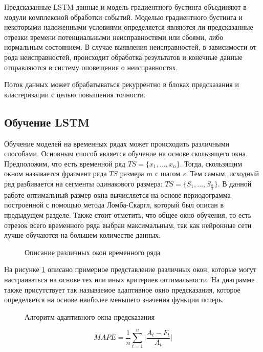 Предсказанные LSTM данные и модель градиентного бустинга
объединяют в модули комплексной обработки событий.
Моделью градиентного бустинга и некоторыми
наложенными условиями определяется
являются ли предсказанные отрезки времени
потенциальными неисправностями или сбоями,
либо нормальным состоянием.
В случае выявления неисправностей,
в зависимости от рода неисправностей,
происходит обработка результатов и
конечные данные отправляются в систему оповещения о неисправностях.

Поток данных может обрабатываться рекуррентно в блоках
предсказания и кластеризации с целью повышения точности.

\subsection{Обучение LSTM}

Обучение моделей на временных рядах может происходить различными способами.
Основным способ является обучение на основе скользящего окна.
Предположим, что есть временной ряд $TS = \{x_1, ..., x_n\}$.
Тогда, скользящим окном называется фрагмент ряда $TS$ размера $m$ с шагом $s$.
Тем самым, исходный ряд разбивается на сегменты одинакового размера: $TS = \{S_1, ..., S_{\frac{n}{s}}\}$.
В данной работе оптимальный размер окна вычисляется на основе периодограмма
построенной с помощью метода Ломба-Скаргл, который был описан в предыдущем разделе.
Также стоит отметить, что общее окно обучения,
то есть отрезок всего временного ряда выбран максимальным,
так как нейронные сети лучше обучаются на большем количестве данных.

\begin{figure}[H]
    \caption{Описание различных окон временного ряда}
    \label{windows}
\end{figure}

На рисунке \ref{windows} описано примерное представление различных окон,
которые могут настраиваться на основе тех или иных критериев оптимальности.
На диаграмме также присутствует так называемое
адаптивное окно предсказания, которое определяется
на основе наиболее меньшего значения функции потерь.

\begin{figure}[H]
    \caption{Алгоритм адаптивного окна предсказания}
    \label{predwindow}
\end{figure}

\begin{equation} \label{mape}
    MAPE = \frac{1}{n} \sum_{t=1}^n \Big| \frac{A_t - F_t}{A_t} \Big|
\end{equation}

